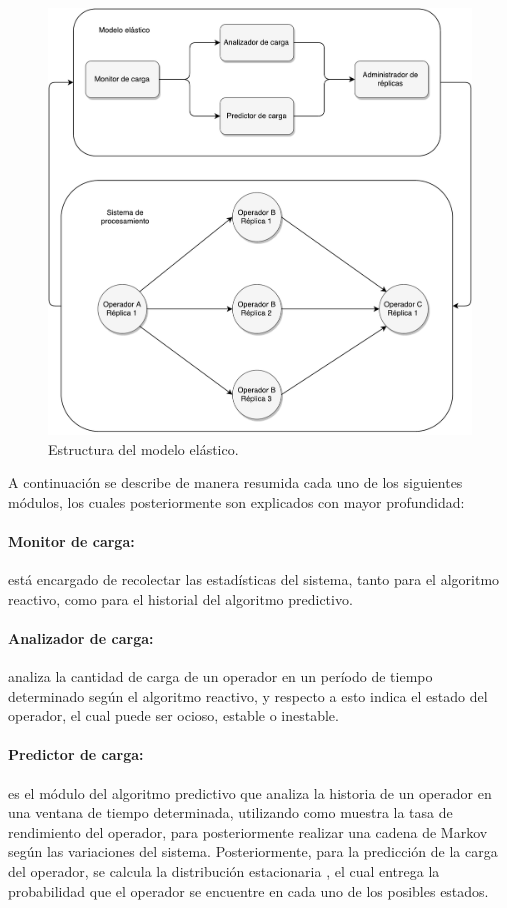 \begin{figure}[ht!]
  \centering
    \includegraphics[scale=0.5]{images/Diagrama.pdf}
  \caption{Estructura del modelo el\'astico.}
  \label{fig:componentesSistemas}
\end{figure}

A continuaci\'on se describe de manera resumida cada uno de los siguientes m\'odulos, los cuales posteriormente son explicados con mayor profundidad:

\paragraph{Monitor de carga:} est\'a encargado de recolectar las estad\'isticas del sistema, tanto para el algoritmo reactivo, como para el historial del algoritmo predictivo.

\paragraph{Analizador de carga:} analiza la cantidad de carga de un operador en un per\'iodo de tiempo determinado seg\'un el algoritmo reactivo, y respecto a esto indica el estado del operador,  el cual puede ser ocioso, estable o inestable.

\paragraph{Predictor de carga:} es el m\'odulo del algoritmo predictivo que analiza la historia de un operador en una ventana de tiempo determinada, utilizando como muestra la tasa de rendimiento del operador, para posteriormente realizar una cadena de Markov seg\'un las variaciones del sistema. Posteriormente, para la predicci\'on de la carga del operador, se calcula la distribuci\'on estacionaria \citep{Papoulis1984}, el cual entrega la probabilidad que el operador se encuentre en cada uno de los posibles estados.


